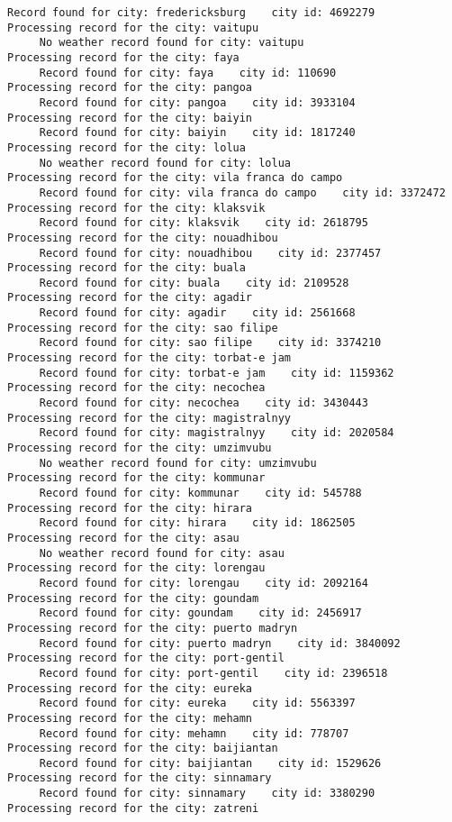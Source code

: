 \documentclass[11pt]{article}
\begin{document}
\begin{Verbatim}[commandchars=\\\{\}]
     Record found for city: fredericksburg    city id: 4692279
Processing record for the city: vaitupu
     No weather record found for city: vaitupu
Processing record for the city: faya
     Record found for city: faya    city id: 110690
Processing record for the city: pangoa
     Record found for city: pangoa    city id: 3933104
Processing record for the city: baiyin
     Record found for city: baiyin    city id: 1817240
Processing record for the city: lolua
     No weather record found for city: lolua
Processing record for the city: vila franca do campo
     Record found for city: vila franca do campo    city id: 3372472
Processing record for the city: klaksvik
     Record found for city: klaksvik    city id: 2618795
Processing record for the city: nouadhibou
     Record found for city: nouadhibou    city id: 2377457
Processing record for the city: buala
     Record found for city: buala    city id: 2109528
Processing record for the city: agadir
     Record found for city: agadir    city id: 2561668
Processing record for the city: sao filipe
     Record found for city: sao filipe    city id: 3374210
Processing record for the city: torbat-e jam
     Record found for city: torbat-e jam    city id: 1159362
Processing record for the city: necochea
     Record found for city: necochea    city id: 3430443
Processing record for the city: magistralnyy
     Record found for city: magistralnyy    city id: 2020584
Processing record for the city: umzimvubu
     No weather record found for city: umzimvubu
Processing record for the city: kommunar
     Record found for city: kommunar    city id: 545788
Processing record for the city: hirara
     Record found for city: hirara    city id: 1862505
Processing record for the city: asau
     No weather record found for city: asau
Processing record for the city: lorengau
     Record found for city: lorengau    city id: 2092164
Processing record for the city: goundam
     Record found for city: goundam    city id: 2456917
Processing record for the city: puerto madryn
     Record found for city: puerto madryn    city id: 3840092
Processing record for the city: port-gentil
     Record found for city: port-gentil    city id: 2396518
Processing record for the city: eureka
     Record found for city: eureka    city id: 5563397
Processing record for the city: mehamn
     Record found for city: mehamn    city id: 778707
Processing record for the city: baijiantan
     Record found for city: baijiantan    city id: 1529626
Processing record for the city: sinnamary
     Record found for city: sinnamary    city id: 3380290
Processing record for the city: zatreni

\end{Verbatim}
\end{document}
